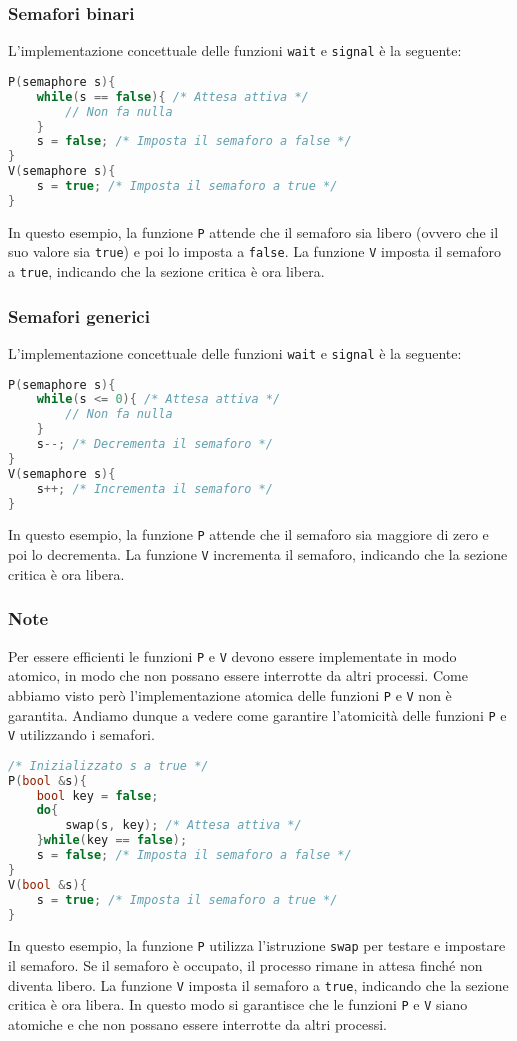     \subsubsection{Semafori binari}
        L'implementazione concettuale delle funzioni \texttt{wait} e \texttt{signal} è la seguente:
        \begin{lstlisting}[language=C++,basicstyle=\footnotesize]
P(semaphore s){
    while(s == false){ /* Attesa attiva */
        // Non fa nulla
    }
    s = false; /* Imposta il semaforo a false */
}
V(semaphore s){
    s = true; /* Imposta il semaforo a true */
}
        \end{lstlisting}
        In questo esempio, la funzione \texttt{P} attende che il semaforo sia libero (ovvero che il suo valore sia \texttt{true}) e poi lo imposta a \texttt{false}. La funzione \texttt{V} imposta il semaforo a \texttt{true}, indicando che la sezione critica è ora libera. 
    \subsubsection{Semafori generici}
        L'implementazione concettuale delle funzioni \texttt{wait} e \texttt{signal} è la seguente:
        \begin{lstlisting}[language=C++,basicstyle=\footnotesize]
P(semaphore s){
    while(s <= 0){ /* Attesa attiva */
        // Non fa nulla
    }
    s--; /* Decrementa il semaforo */
}
V(semaphore s){
    s++; /* Incrementa il semaforo */
}
        \end{lstlisting}
        In questo esempio, la funzione \texttt{P} attende che il semaforo sia maggiore di zero e poi lo decrementa. La funzione \texttt{V} incrementa il semaforo, indicando che la sezione critica è ora libera.
    \subsubsection{Note}
        Per essere efficienti le funzioni \texttt{P} e \texttt{V} devono essere implementate in modo atomico, in modo che non possano essere interrotte da altri processi. Come abbiamo visto però l'implementazione atomica delle funzioni \texttt{P} e \texttt{V} non è garantita. Andiamo dunque a vedere come garantire l'atomicità delle funzioni \texttt{P} e \texttt{V} utilizzando i semafori.
        \begin{lstlisting}[language=C++,basicstyle=\footnotesize]
/* Inizializzato s a true */
P(bool &s){
    bool key = false;
    do{
        swap(s, key); /* Attesa attiva */
    }while(key == false);
    s = false; /* Imposta il semaforo a false */
}
V(bool &s){
    s = true; /* Imposta il semaforo a true */
}
        \end{lstlisting}
        In questo esempio, la funzione \texttt{P} utilizza l'istruzione \texttt{swap} per testare e impostare il semaforo. Se il semaforo è occupato, il processo rimane in attesa finché non diventa libero. La funzione \texttt{V} imposta il semaforo a \texttt{true}, indicando che la sezione critica è ora libera. In questo modo si garantisce che le funzioni \texttt{P} e \texttt{V} siano atomiche e che non possano essere interrotte da altri processi.
